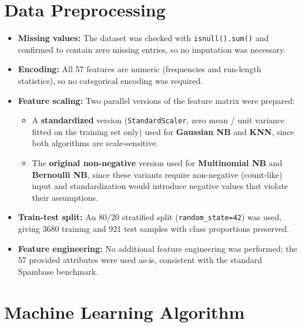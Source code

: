 \documentclass[12pt,a4paper]{article}
\begin{document}
\section{Data Preprocessing}
\begin{itemize}
\item \textbf{Missing values:} The dataset was checked with \texttt{isnull().sum()} and
confirmed to contain zero missing entries, so no imputation was necessary.
\item \textbf{Encoding:} All 57 features are numeric (frequencies and run-length
statistics), so no categorical encoding was required.
\item \textbf{Feature scaling:} Two parallel versions of the feature matrix were
prepared:
  \begin{itemize}
  \item A \textbf{standardized} version (\texttt{StandardScaler}, zero mean / unit
  variance fitted on the training set only) used for \textbf{Gaussian NB} and
  \textbf{KNN}, since both algorithms are scale-sensitive.
  \item The \textbf{original non-negative} version used for \textbf{Multinomial NB} and
  \textbf{Bernoulli NB}, since these variants require non-negative (count-like) input
  and standardization would introduce negative values that violate their assumptions.
  \end{itemize}
\item \textbf{Train-test split:} An 80/20 stratified split (\texttt{random\_state=42})
was used, giving 3680 training and 921 test samples with class proportions preserved.
\item \textbf{Feature engineering:} No additional feature engineering was performed; the
57 provided attributes were used as-is, consistent with the standard Spambase benchmark.
\end{itemize}

\section{Machine Learning Algorithm}
\end{document}
